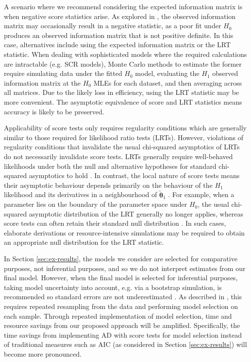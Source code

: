 \documentclass{article}
\newcommand{\thetaOneTilde}{\tilde{\boldsymbol{\theta}}_1}
\begin{document}
A scenario where we recommend considering the expected information
matrix is when negative score statistics arise. As
explored in \textcite{morgan2007}, the observed information
matrix may occasionally result in a negative statistic, as a poor
fit under $H_0$ produces an observed information matrix that is not
positive definite. In this case, alternatives include
using the expected information matrix or the LRT
statistic. When dealing with sophisticated models where
the required calculations are intractable
(e.g. SCR models), Monte Carlo methods to estimate
the former require simulating data under the fitted $H_0$ model, evaluating the
$H_1$ observed information matrix at the $H_0$ MLEs for each dataset,
and then averaging across all matrices. Due to the likely loss in
efficiency, using the LRT statistic may be more
convenient. The asymptotic equivalence of score and LRT
statistics means accuracy is likely to be preserved.

Applicability of score tests only requires regularity conditions
which are generally similar to
those required for likelihood ratio tests (LRTs). However, violations
of regularity conditions that invalidate the usual chi-squared
asymptotics of LRTs do not necessarily invalidate score tests. LRTs
generally require well-behaved likelihoods under both the null and
alternative hypotheses for standard chi-squared asymptotics to hold
\parencite{vaartAsymptoticStatistics2012}. In contrast, the local
nature of score tests means their asymptotic behaviour depends
primarily on the behaviour of the $H_1$ likelihood and its
derivatives in a neighbourhood of
$\thetaOneTilde$ \parencite{rao1948}. For
example, when a parameter lies on the boundary of the parameter space
under $H_0$, the usual chi-squared asymptotic distribution of the
LRT generally no longer applies, whereas score tests can often retain
their standard null distribution \parencite{rao2005}. In such cases,
elaborate derivations or resource-intensive simulations may be
required to obtain an appropriate null distribution for the LRT
statistic. 

In Section \ref{sec:ex-results}, the models we consider are selected
for comparative purposes, not inferential purposes, and so we do
not interpret estimates from our final model. However, when the
final model is selected for inferential purposes, taking model
uncertainty into account, e.g. via a bootstrap simulation, is recommended
so standard errors are not underestimated
\parencite{mccreaMorganBreg2012}. As described in
\textcite{buckland1997}, this requires repeated resampling from the
data and performing model selection on each sample. Through repeated
implementation of model selection, time and resource savings from
our proposed approach will be amplified. Specifically, the time savings
from implementing AD with score tests for model selection instead of
traditional measures such as AIC (as considered in Section
\ref{sec:ex-results}) will become more pronounced.
\end{document}
